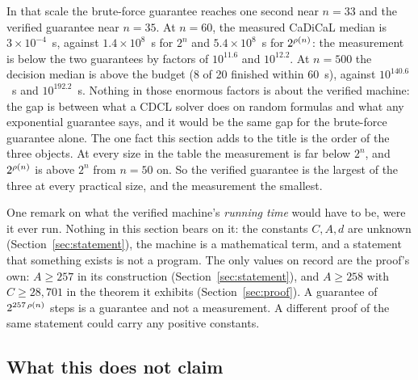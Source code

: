 In that scale the brute-force guarantee reaches one second near
$n = 33$ and the verified guarantee near $n = 35$. At $n = 60$, the
measured CaDiCaL median is $3 \times 10^{-4}$~s, against $1.4 \times
10^{8}$~s for $2^n$ and $5.4 \times 10^{8}$~s for $2^{\rho(n)}$: the
measurement is below the two guarantees by factors of $10^{11.6}$ and
$10^{12.2}$. At $n = 500$ the decision median is above the budget (8 of
20 finished within 60~s), against $10^{140.6}$~s and $10^{192.2}$~s.
Nothing in those enormous factors is about the verified machine: the
gap is between what a CDCL solver does on random formulas and what any
exponential guarantee says, and it would be the same gap for the
brute-force guarantee alone. The one fact this section adds to the
title is the order of the three objects. At every size in the table the
measurement is far below $2^n$, and $2^{\rho(n)}$ is above $2^n$ from
$n = 50$ on. So the verified guarantee is the largest of the three at
every practical size, and the measurement the smallest.

One remark on what the verified machine's \emph{running time} would
have to be, were it ever run. Nothing in this section bears on it: the
constants $C, A, d$ are unknown (Section~\ref{sec:statement}), the
machine is a mathematical term, and a statement that something exists
is not a program. The only values on record are the proof's own:
$A \ge 257$ in its construction (Section~\ref{sec:statement}), and
$A \ge 258$ with $C \ge 28{,}701$ in the theorem it exhibits
(Section~\ref{sec:proof}). A guarantee of $2^{257\,\rho(n)}$ steps is a guarantee
and not a measurement. A different proof of the same statement
could carry any positive constants.

\subsection{What this does not claim}
\label{sec:practitioner-not}

